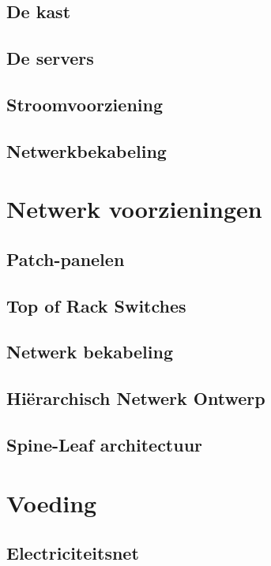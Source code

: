 \documentclass[a4paper,12pt,twoside,openright,titlepage]{book}
\begin{document}
\section{De kast}

\section{De servers}

\section{Stroomvoorziening}

\section{Netwerkbekabeling}


\chapter{Netwerk voorzieningen}
\section{Patch-panelen}

\section{Top of Rack Switches}

\section{Netwerk bekabeling}

\section{Hi\"erarchisch Netwerk Ontwerp}

\section{Spine-Leaf architectuur}


\chapter{Voeding}

\section{Electriciteitsnet}

\end{document}
